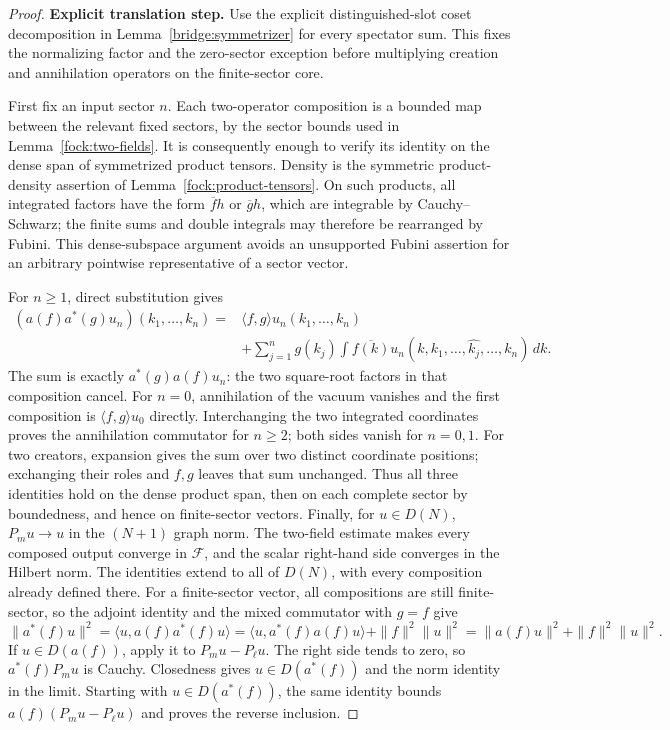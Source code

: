 \documentclass[11pt,a4paper]{article}
\theoremstyle{definition}
\theoremstyle{remark}
\begin{document}
\begin{proof}
\noindent\textbf{Explicit translation step.} Use the explicit distinguished-slot coset decomposition in
Lemma~\ref{bridge:symmetrizer} for every spectator sum. This fixes the
normalizing factor and the zero-sector exception before multiplying
creation and annihilation operators on the finite-sector core.

First fix an input sector $n$. Each two-operator composition is a
bounded map between the relevant fixed sectors, by the sector bounds
used in Lemma~\ref{fock:two-fields}. It is consequently enough to
verify its identity on the dense span of symmetrized product tensors.
Density is the symmetric product-density assertion of
Lemma~\ref{fock:product-tensors}. On such products, all integrated factors have the
form $\overline f h$ or $\overline g h$, which are integrable by
Cauchy--Schwarz; the finite sums and double integrals may therefore
be rearranged by Fubini. This dense-subspace argument avoids an
unsupported Fubini assertion for an arbitrary pointwise
representative of a sector vector.

For $n\geq1$, direct substitution gives
\[
 \begin{split}
 (a(f)a^*(g)u_n)(k_1,\ldots,k_n)
   ={}&\langle f,g\rangle u_n(k_1,\ldots,k_n)\\
    &+\sum_{j=1}^n g(k_j)
        \int\overline{f(k)}
           u_n(k,k_1,\ldots,\widehat{k_j},\ldots,k_n)\,dk.
 \end{split}
\]
The sum is exactly $a^*(g)a(f)u_n$: the two square-root factors in
that composition cancel. For $n=0$, annihilation of the vacuum
vanishes and the first composition is
$\langle f,g\rangle u_0$ directly. Interchanging the two integrated
coordinates proves the annihilation commutator for $n\geq2$;
both sides vanish for $n=0,1$. For two creators, expansion gives the
sum over two distinct coordinate positions; exchanging their roles
and $f,g$ leaves that sum unchanged. Thus all three identities hold
on the dense product span, then on each complete sector by boundedness,
and hence on finite-sector vectors. Finally, for $u\in D(N)$,
$P_mu\to u$ in the $(N+1)$ graph norm. The two-field estimate makes
every composed output converge in $\mathcal F$, and the scalar
right-hand side converges in the Hilbert norm. The identities extend
to all of $D(N)$, with every composition already defined there.
For a finite-sector vector, all compositions are still finite-sector,
so the adjoint identity and the mixed commutator with $g=f$ give
\[
 \|a^*(f)u\|^2
  =\langle u,a(f)a^*(f)u\rangle
  =\langle u,a^*(f)a(f)u\rangle+\|f\|^2\|u\|^2
  =\|a(f)u\|^2+\|f\|^2\|u\|^2.
\]
If $u\in D(a(f))$, apply it
to $P_mu-P_\ell u$. The right side tends to zero, so
$a^*(f)P_mu$ is Cauchy. Closedness gives $u\in D(a^*(f))$ and the norm
identity in the limit. Starting with $u\in D(a^*(f))$, the same identity
bounds $a(f)(P_mu-P_\ell u)$ and proves the reverse inclusion.
\end{proof}
\end{document}

